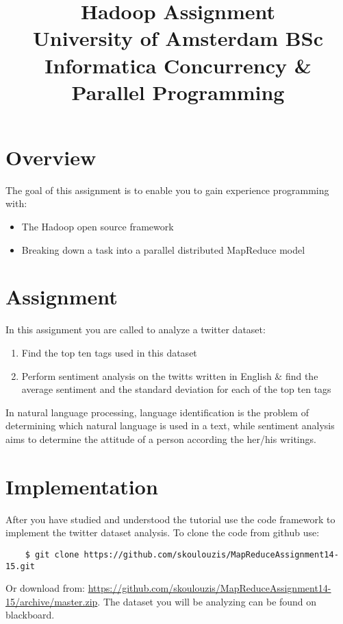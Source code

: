 \documentclass[a4paper,10pt]{article}
\date{}
\title{Hadoop Assignment\\
  University of Amsterdam BSc Informatica
  Concurrency \& Parallel Programming
}
\begin{document}
  \maketitle
  
  \tableofcontents
  
  \section{Overview}
  The goal of this assignment is to enable you to gain experience programming with:
  \begin{itemize}
    \item The Hadoop open source framework
    \item Breaking down a task into a parallel distributed MapReduce model
  \end{itemize}
  
  
  \section{Assignment}
  
  In this assignment you are called to analyze a twitter dataset: 
  \begin{enumerate}
    \item Find the top ten tags used in this dataset 
    \item Perform sentiment analysis on the twitts written in English \& find the average sentiment and the standard deviation for each of the top ten tags
  \end{enumerate}
  
  In natural language processing, language identification is the problem of determining which natural language is used in a text, while sentiment analysis aims to determine the attitude of a person according the her/his writings.   
  
  \section{Implementation}
  After you have studied and understood the tutorial use the code framework to implement the twitter dataset analysis. To clone the code from github use:
  \lstset{language=} 
  \begin{lstlisting}
    $ git clone https://github.com/skoulouzis/MapReduceAssignment14-15.git
  \end{lstlisting}
  Or download from: \url{https://github.com/skoulouzis/MapReduceAssignment14-15/archive/master.zip}. 
  The dataset you will be analyzing can be found on blackboard.
  
\end{document}
